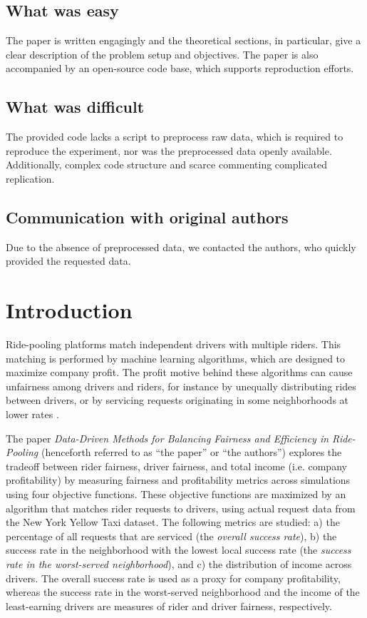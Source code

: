\subsection*{What was easy}

The paper is written engagingly and the theoretical sections, in particular, give a clear description of the problem setup and objectives. The paper is also accompanied by an open-source code base, which supports reproduction efforts.

\subsection*{What was difficult}

The provided code lacks a script to preprocess raw data, which is required to reproduce the experiment, nor was the preprocessed data openly available. Additionally, complex code structure and scarce commenting complicated replication.


\subsection*{Communication with original authors}
Due to the absence of preprocessed data, we contacted the authors, who quickly provided the requested data.
\newpage

\section{Introduction}
Ride-pooling platforms match independent drivers with multiple riders. This matching is performed by machine learning algorithms, which are designed to maximize company profit. The profit motive behind these algorithms can cause unfairness among drivers and riders, for instance by unequally distributing rides between drivers, or by servicing requests originating in some neighborhoods at lower rates \cite{raman_data-driven_2021,cook2021gender,moody2019rider}.

The paper \textit {Data-Driven Methods for Balancing Fairness and Efficiency in Ride-Pooling} \cite{raman_data-driven_2021} (henceforth referred to as ``the paper'' or ``the authors'') explores the tradeoff between rider fairness, driver fairness, and total income (i.e. company profitability) by measuring fairness and profitability metrics across simulations using four objective functions. These objective functions are maximized by an algorithm that matches rider requests to drivers, using actual request data from the New York Yellow Taxi dataset. The following metrics are studied: a) the percentage of all requests that are serviced (the \textit{overall success rate}), b) the success rate in the neighborhood with the lowest local success rate (the \textit{success rate in the worst-served neighborhood}), and c) the distribution of income across drivers. The overall success rate is used as a proxy for company profitability, whereas the success rate in the worst-served neighborhood and the income of the least-earning drivers are measures of rider and driver fairness, respectively.

